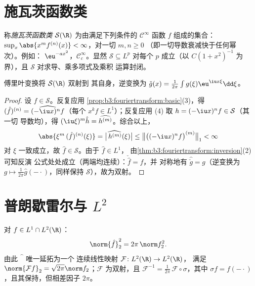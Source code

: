 \section{施瓦茨函数类}

\begin{definition}\label{def:b3:fouriertransform:schwartz}
称\emph{施瓦茨函数类} $\mathcal
S(\R)$ 为由满足下列条件的 $\mathcal C^\infty$ 函数 $f$ 组成的集合：
$\sup_x\abs{x^m f^{(n)}(x)} < \infty$，对一切 $m, n \geq 0$
（即一切导数衰减快于任何幂次）。例如：
$\eu^{-ax^2}$，$\mathcal C_c^\infty$。显然 $\mathcal S
\subseteq L^p$ 对每个 $p$ 成立（以 $C(1 + x^2)^{-1}$ 为界），且
$\mathcal S$ 对求导、乘多项式及乘积
运算封闭。
\end{definition}

\begin{theorem}\label{thm:b3:fouriertransform:schwartz}
傅里叶变换将 $\mathcal S(\R)$ 双射到
其自身，逆变换为 $\check g(x) = \frac1{2\pi}\int
g(\xi)\eu^{\iu x\xi}\dd\xi$。
\end{theorem}

\begin{proof}
设 $f \in \mathcal S$。反复应用
\cref{prop:b3:fouriertransform:basic}(3)，得 $(\hat f)^{(n)} =
\widehat{(-\iu x)^nf}$（每个 $x^kf \in L^1$）；反复应用 (4)
取 $h = (-\iu x)^nf \in \mathcal S$（其一切
导数均），得 $(\iu\xi)^m\hat h =
\widehat{h^{(m)}}$。综合以上，
\[
\abs{\xi^m\,(\hat f)^{(n)}(\xi)}
= \bigl|\widehat{\,h^{(m)}}(\xi)\bigr|
\leq \bigl\|\bigl((-\iu x)^nf\bigr)^{(m)}\bigr\|_1 < \infty
\]
对 $\xi$ 一致成立，故 $\hat f \in \mathcal S$。由于 $\hat f \in L^1$，
由\cref{thm:b3:fouriertransform:inversion}(2)可知反演
公式处处成立（两端均连续）：$\check{\hat f} = f$，并
对称地有 $\widehat{\check g} = g$（逆变换为
$g \mapsto \frac1{2\pi}\hat g(-\cdot)$，同样保持
$\mathcal S$），故为双射。
\end{proof}

\section{普朗歇雷尔与 \texorpdfstring{$L^2$}{L2}}

\begin{theorem}[普朗歇雷尔]\label{thm:b3:fouriertransform:plancherel}
对 $f \in L^1 \cap L^2(\R)$：
\[
\norm{\hat f}_2^2 = 2\pi\,\norm f_2^2 .
\]
由此 $\widehat{\phantom f}$ 唯一延拓为一个
连续线性映射 $\mathcal F \colon L^2(\R) \to L^2(\R)$，
满足 $\norm{\mathcal Ff}_2 = \sqrt{2\pi}\norm f_2$；$\mathcal
F$ 为双射，且 $\mathcal F^{-1} =
\frac1{2\pi}\,\mathcal F\circ\sigma$，其中 $\sigma f =
f(-\cdot)$，且其保持，但相差因子
$2\pi$。
\end{theorem}

